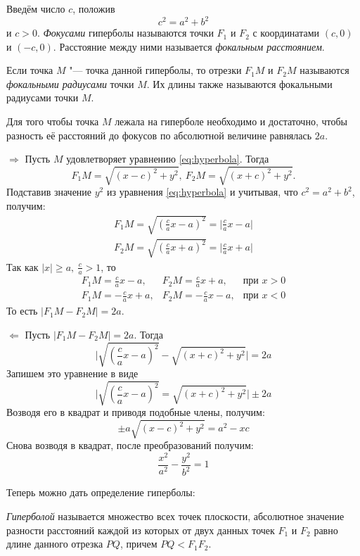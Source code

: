 Введём число $c$, положив
$$
  c^2 = a^2 + b^2
$$ и $c > 0$. \textit{Фокусами} гиперболы называются точки $F_1$ и $F_2$ с координатами $(c, 0)$ и $(-c, 0)$. Расстояние между ними называется \textit{фокальным расстоянием}.

Если точка $M$ "--- точка данной гиперболы, то отрезки $F_1M$ и $F_2M$ называются \textit{фокальными радиусами} точки $M$. Их длины также называются фокальными радиусами точки $M$.

\begin{theorem}
  Для того чтобы точка $M$ лежала на гиперболе необходимо и достаточно, чтобы разность её расстояний до фокусов по абсолютной величине равнялась $2a$.
\end{theorem}
\begin{Proof}
  $\Rightarrow$ Пусть $M$ удовлетворяет уравнению \ref{eq:hyperbola}. Тогда
    $$
    F_1M = \sqrt{(x - c)^2 + y^2}, ~ F_2M = \sqrt{(x + c)^2 + y^2}.
    $$
    Подставив значение $y^2$ из уравнения \ref{eq:hyperbola} и учитывая, что $c^2 = a^2 + b^2$, получим:
    \begin{gather*}
      F_1M = \sqrt{(\frac{c}{a}x - a)^2} = \mathopen|\frac{c}{a}x - a \mathclose| \\
      F_2M = \sqrt{(\frac{c}{a}x + a)^2} = \mathopen|\frac{c}{a}x + a \mathclose|
    \end{gather*}
    Так как $\mathopen|x\mathclose| \geq a, ~ \frac{c}{a} > 1$, то 
    $$
    \begin{array}{ccc}
      F_1M = \frac{c}{a}x - a, & F_2M = \frac{c}{a}x + a, & \text{при }x > 0 \\
      F_1M = -\frac{c}{a}x + a, & F_2M = -\frac{c}{a}x - a, & \text{при }x < 0 
    \end{array}
    $$
    То есть $\mathopen|F_1M - F_2M\mathclose| = 2a$.

  $\Leftarrow$ Пусть $\mathopen|F_1M - F_2M\mathclose| = 2a$. Тогда
  $$
    \mathopen| \sqrt{(\frac{c}{a}x - a)^2} - \sqrt{(x + c)^2 + y^2} \mathclose| = 2a
  $$
  Запишем это уравнение в виде 
  $$
  \mathopen| \sqrt{(\frac{c}{a}x - a)^2} = \sqrt{(x + c)^2 + y^2} \mathclose| \pm 2a
  $$
  Возводя его в квадрат и приводя подобные члены, получим:
  $$
    \pm a \sqrt{(x - c)^2 + y^2} = a^2 - xc
  $$
  Снова возводя в квадрат, после преобразований получим:
  $$
    \frac{x^2}{a^2} - \frac{y^2}{b^2} = 1
  $$
\end{Proof}
Теперь можно дать определение гиперболы:
\begin{definition}
  \textit{Гиперболой} называется множество всех точек плоскости, абсолютное значение разности расстояний каждой из которых от двух данных точек $F_1$ и $F_2$ равно длине данного отрезка $PQ$, причем $PQ < F_1F_2$.
\end{definition}


